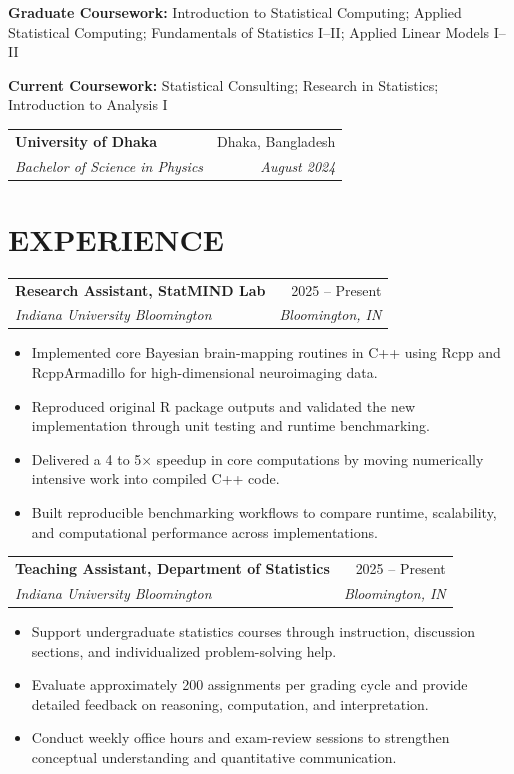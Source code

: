 \documentclass[10pt,letterpaper]{article}
\makeatletter
\newcommand{\resumeEntry}[4]{%
	\begin{tabularx}{\textwidth}{@{}Xr@{}}
		\textbf{#1} & #2 \\
		\textit{#3} & \textit{#4}
	\end{tabularx}%
}
\newenvironment{resumeItems}{%
	\begin{itemize}[
		label=\textbullet,
		leftmargin=14pt,
		labelsep=5pt,
		itemsep=0.5pt,
		topsep=1.0pt,
		parsep=0pt,
		partopsep=0pt
	]
}{%
	\end{itemize}
}
\makeatother
\begin{document}
\vspace{0.5pt}

\textbf{Graduate Coursework:}
Introduction to Statistical Computing; Applied Statistical Computing;
Fundamentals of Statistics I--II; Applied Linear Models I--II

\vspace{0.3pt}

\textbf{Current Coursework:}
Statistical Consulting; Research in Statistics;
Introduction to Analysis I

\vspace{2.2pt}

\resumeEntry
	{University of Dhaka}
	{Dhaka, Bangladesh}
	{Bachelor of Science in Physics}
	{August 2024}

\section*{EXPERIENCE}

\resumeEntry
	{Research Assistant, StatMIND Lab}
	{2025 -- Present}
	{Indiana University Bloomington}
	{Bloomington, IN}

\begin{resumeItems}
	\item Implemented core Bayesian brain-mapping routines in C++ using Rcpp and RcppArmadillo for high-dimensional neuroimaging data.

	\item Reproduced original R package outputs and validated the new implementation through unit testing and runtime benchmarking.

	\item Delivered a 4 to 5$\times$ speedup in core computations by moving numerically intensive work into compiled C++ code.

	\item Built reproducible benchmarking workflows to compare runtime, scalability, and computational performance across implementations.
\end{resumeItems}

\vspace{1.3pt}

\resumeEntry
	{Teaching Assistant, Department of Statistics}
	{2025 -- Present}
	{Indiana University Bloomington}
	{Bloomington, IN}

\begin{resumeItems}
	\item Support undergraduate statistics courses through instruction, discussion sections, and individualized problem-solving help.

	\item Evaluate approximately 200 assignments per grading cycle and provide detailed feedback on reasoning, computation, and interpretation.

	\item Conduct weekly office hours and exam-review sessions to strengthen conceptual understanding and quantitative communication.
\end{resumeItems}
\end{document}
